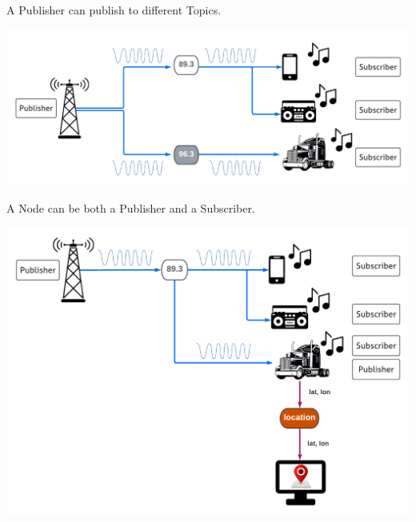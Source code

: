 \documentclass[usenames,11,dvipsnames,svgnames,x11names,aspectratio=1610,bibref]{beamer}
\renewcommand\sec{{\cnordSix{\secname}\hfill\mydisclaimer} }
\begin{document}
\begin{frame}[fragile]{\sec}
\vspace*{\fill}
\begin{center} 
A Publisher can publish to different Topics.

\includegraphics[width=.8\linewidth]{figures/lecture2/analogy8.pdf}

\end{center}
\vspace*{\fill}
\end{frame}



\begin{frame}[fragile]{\sec}
\vspace*{\fill}
\begin{center} 
A Node can be both a Publisher and a Subscriber.

\includegraphics[width=.7\linewidth]{figures/lecture2/analogy9.pdf}

\end{center}
\vspace*{\fill}
\end{frame}


\end{document}
